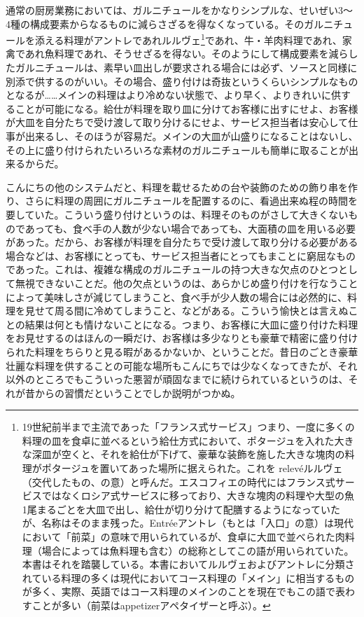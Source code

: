 通常の厨房業務においては、ガルニチュールをかなりシンプルな、せいぜい3〜
4種の構成要素からなるものに減らさざるを得なくなっている。そのガルニチュールを添える料理がアントレであれルルヴェ\footnote{19世紀前半まで主流であった「フランス式サービス」つまり、一度に多くの料理の皿を食卓に並べるという給仕方式において、ポタージュを入れた大きな深皿が空くと、それを給仕が下げて、豪華な装飾を施した大きな塊肉の料理がポタージュを置いてあった場所に据えられた。これを
  \protect\hypertarget{releve}{relevé}ルルヴェ（交代したもの、の意）と呼んだ。エスコフィエの時代にはフランス式サービスではなくロシア式サービスに移っており、大きな塊肉の料理や大型の魚1尾まるごとを大皿で出し、給仕が切り分けて配膳するようになっていたが、名称はそのまま残った。Entréeアントレ（もとは「入口」の意）は現代において「前菜」の意味で用いられているが、食卓に大皿で並べられた肉料理（場合によっては魚料理も含む）の総称としてこの語が用いられていた。本書はそれを踏襲している。本書においてルルヴェおよびアントレに分類されている料理の多くは現代においてコース料理の「メイン」に相当するものが多く、実際、英語ではコース料理のメインのことを現在でもこの語で表わすことが多い（前菜はappetizerアペタイザーと呼ぶ）。}であれ、牛・羊肉料理であれ、家禽であれ魚料理であれ、そうせざるを得ない。そのようにして構成要素を減らしたガルニチュールは、素早い皿出しが要求される場合には必ず、ソースと同様に別添で供するのがいい。その場合、盛り付けは奇抜というくらいシンプルなものとなるが\ldots{}\ldots{}メインの料理はより冷めない状態で、より早く、よりきれいに供することが可能になる。給仕が料理を取り皿に分けてお客様に出すにせよ、お客様が大皿を自分たちで受け渡して取り分けるにせよ、サービス担当者は安心して仕事が出来るし、そのほうが容易だ。メインの大皿が山盛りになることはないし、その上に盛り付けられたいろいろな素材のガルニチュールも簡単に取ることが出来るからだ。

こんにちの他のシステムだと、料理を載せるための台や装飾のための飾り串を作り、さらに料理の周囲にガルニチュールを配置するのに、看過出来ぬ程の時間を要していた。こういう盛り付けというのは、料理そのものがさして大きくないものであっても、食べ手の人数が少ない場合であっても、大面積の皿を用いる必要があった。だから、お客様が料理を自分たちで受け渡して取り分ける必要がある場合などは、お客様にとっても、サービス担当者にとってもまことに窮屈なものであった。これは、複雑な構成のガルニチュールの持つ大きな欠点のひとつとして無視できないことだ。他の欠点というのは、あらかじめ盛り付けを行なうことによって美味しさが減じてしまうこと、食べ手が少人数の場合には必然的に、料理を見せて周る間に冷めてしまうこと、などがある。こういう愉快とは言えぬことの結果は何とも情けないことになる。つまり、お客様に大皿に盛り付けた料理をお見せするのはほんの一瞬だけ、お客様は多少なりとも豪華で精密に盛り付けられた料理をちらりと見る暇があるかないか、ということだ。昔日のごとき豪華壮麗な料理を供することの可能な場所もこんにちでは少なくなってきたが、それ以外のところでもこういった悪習が頑固なまでに続けられているというのは、それが昔からの習慣だということでしか説明がつかぬ。


